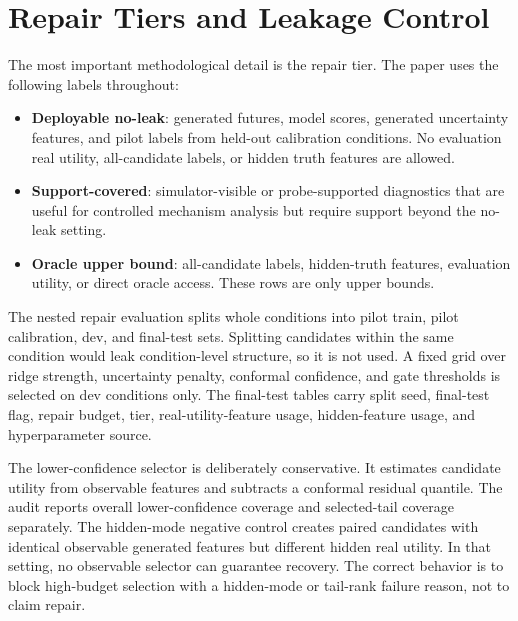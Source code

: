 \documentclass[10pt]{article}
\begin{document}
\section{Repair Tiers and Leakage Control}

The most important methodological detail is the repair tier. The paper uses the following labels throughout:
\begin{itemize}
  \item \textbf{Deployable no-leak}: generated futures, model scores, generated uncertainty features, and pilot labels from held-out calibration conditions. No evaluation real utility, all-candidate labels, or hidden truth features are allowed.
  \item \textbf{Support-covered}: simulator-visible or probe-supported diagnostics that are useful for controlled mechanism analysis but require support beyond the no-leak setting.
  \item \textbf{Oracle upper bound}: all-candidate labels, hidden-truth features, evaluation utility, or direct oracle access. These rows are only upper bounds.
\end{itemize}

The nested repair evaluation splits whole conditions into pilot train, pilot calibration, dev, and final-test sets. Splitting candidates within the same condition would leak condition-level structure, so it is not used. A fixed grid over ridge strength, uncertainty penalty, conformal confidence, and gate thresholds is selected on dev conditions only. The final-test tables carry split seed, final-test flag, repair budget, tier, real-utility-feature usage, hidden-feature usage, and hyperparameter source.

The lower-confidence selector is deliberately conservative. It estimates candidate utility from observable features and subtracts a conformal residual quantile. The audit reports \VThreeLCBCoverage{} overall lower-confidence coverage and selected-tail coverage separately. The hidden-mode negative control creates paired candidates with identical observable generated features but different hidden real utility. In that setting, no observable selector can guarantee recovery. The correct behavior is to block high-budget selection with a hidden-mode or tail-rank failure reason, not to claim repair.
\end{document}
